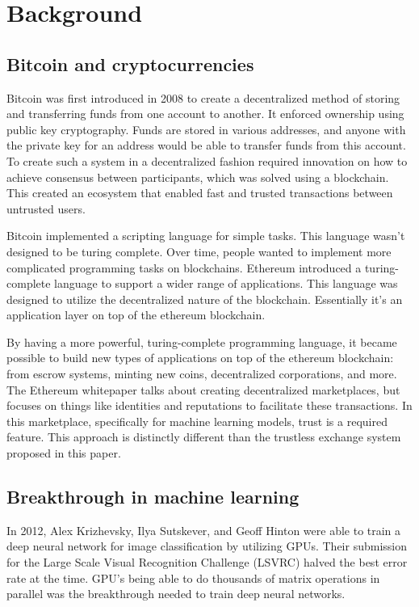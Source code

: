\documentclass{article}
\begin{document}
\section{Background}
\label{background}

\subsection{Bitcoin and cryptocurrencies}
Bitcoin was first introduced in 2008 to create a decentralized method of storing and transferring funds from one account to another. It enforced ownership using public key cryptography. Funds are stored in various addresses, and anyone with the private key for an address would be able to transfer funds from this account. To create such a system in a decentralized fashion required innovation on how to achieve consensus between participants, which was solved using a blockchain. This created an ecosystem that enabled fast and trusted transactions between untrusted users.

Bitcoin implemented a scripting language for simple tasks. This language wasn’t designed to be  turing complete. Over time, people wanted to implement more complicated programming tasks on blockchains. Ethereum introduced a turing-complete language to support a wider range of applications. This language was designed to utilize the decentralized nature of the blockchain. Essentially it’s an application layer on top of the ethereum blockchain.

By having a more powerful, turing-complete programming language, it became possible to build new types of applications on top of the ethereum blockchain: from escrow systems, minting new coins, decentralized corporations, and more. The Ethereum whitepaper talks about creating decentralized marketplaces, but focuses on things like identities and reputations to facilitate these transactions. \cite{eth_paper} In this marketplace, specifically for machine learning models, trust is a required feature. This approach is distinctly different than the trustless exchange system proposed in this paper.

\subsection{Breakthrough in machine learning}

In 2012, Alex Krizhevsky, Ilya Sutskever, and Geoff Hinton were able to train a deep neural network for image classification by utilizing GPUs. \cite{imagenet_cnn_paper} Their submission for the Large Scale Visual Recognition Challenge (LSVRC) halved the best error rate at the time. GPU’s being able to do thousands of matrix operations in parallel was the breakthrough needed to train deep neural networks.
\end{document}
